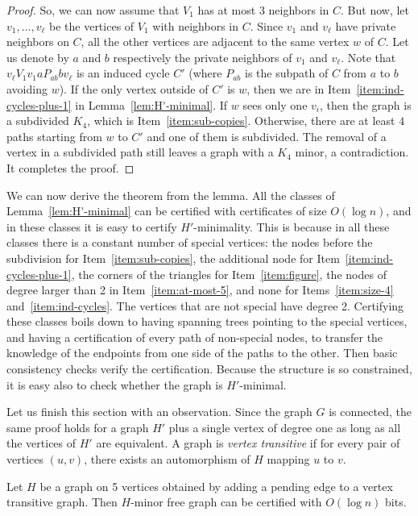 \documentclass[a4paper,thm-restate,USenglish]{lipics-v2019}
\begin{document}
\begin{proof}
So, we can now assume that $V_1$ has at most $3$ neighbors in $C$. But now, let $v_1,\ldots,v_\ell$ be the vertices of $V_1$ with neighbors in $C$. Since $v_1$ and $v_\ell$ have private neighbors on $C$, all the other vertices are adjacent to the same vertex $w$ of $C$. Let us denote by $a$ and $b$ respectively the private neighbors of $v_1$ and $v_\ell$. Note that $v_\ell V_1v_1aP_{ab}bv_\ell$ is an induced cycle $C'$ (where $P_{ab}$ is the subpath of $C$ from $a$ to $b$ avoiding $w$). If the only vertex outside of $C'$ is $w$, then we are in Item~\ref{item:ind-cycles-plus-1} in Lemma~\ref{lem:H'-minimal}. If $w$ sees only one $v_i$, then the graph is a subdivided $K_4$, which is Item~\ref{item:sub-copies}. Otherwise, there are at least $4$ paths starting from $w$ to $C'$ and one of them is subdivided. The removal of a vertex in a subdivided path still leaves a graph with a $K_4$ minor, a contradiction. It completes the proof.
\end{proof}

We can now derive the theorem from the lemma. All the classes of Lemma~\ref{lem:H'-minimal} can be certified with certificates of size $O(\log n)$, and in these classes it is easy to certify $H'$-minimality. This is because in all these classes there is a constant number of special vertices: the nodes before the subdivision for Item~\ref{item:sub-copies}, the additional node for Item~\ref{item:ind-cycles-plus-1}, the corners of the triangles for Item~\ref{item:figure}, the nodes of degree larger than 2 in Item~\ref{item:at-most-5}, and none for Items~\ref{item:size-4} and~\ref{item:ind-cycles}.  
The vertices that are not special have degree 2.
Certifying these classes boils down to having spanning trees pointing to the special vertices, and having a certification of every path of non-special nodes, to transfer the knowledge of the endpoints from one side of the paths to the other. Then basic consistency checks verify the certification. 
Because the structure is so constrained, it is easy also to check whether the graph is $H'$-minimal. 



Let us finish this section with an observation. 
Since the graph $G$ is connected, the same proof holds for a graph $H'$ plus a single vertex of degree one as long as all the vertices of $H'$ are equivalent. A graph is \emph{vertex transitive} if for every pair of vertices $(u,v)$, there exists an automorphism of $H$ mapping $u$ to $v$. 

\begin{lemma}
Let $H$ be a graph on 5 vertices obtained by adding a pending edge to a vertex transitive graph. Then $H$-minor free graph can be certified with $O(\log n)$ bits.
\end{lemma}
\end{document}
